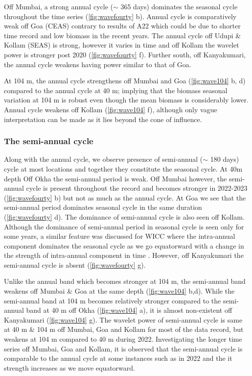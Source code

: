 \documentclass{article}
\begin{document}
	Off Mumbai, a strong annual cycle ($\sim$ 365 days) dominates the seasonal cycle throughout the time series (\cref{fig:wavefourty} b). Annual cycle is comparatively weak off Goa (CEAS) contrary to results of A22 which could be due to shorter time record and low biomass in the recent years. The annual cycle off Udupi \& Kollam (SEAS) is strong, however it varies in time and off Kollam the wavelet power is stronger post 2020 (\cref{fig:wavefourty} f). Further south, off Kanyakumari, the annual cycle weakens having power similar to that of Goa.
	
	At 104 m, the annual cycle strengthens off Mumbai and Goa (\cref{fig:wave104} b, d) compared to the annual cycle at 40 m; implying that the biomass seasonal variation at 104 m is robust even though the mean biomass is considerably lower. Annual cycle weakens off Kollam (\cref{fig:wave104} f), although only vague interpretation can be made as it lies beyond the cone of influence. 
	
	\subsubsection{The semi-annual cycle}
	
	Along with the annual cycle, we observe presence of semi-annual ($\sim$ 180 days) cycle at most locations and together they constitute the seasonal cycle. At 40m depth Off Okha the semi-annual period is weak. Off Mumbai however, the semi-annual cycle is present throughout the record and becomes stronger in 2022-2023 (\cref{fig:wavefourty} b) but not as much as the annual cycle. At Goa we see that the semi-annual period dominates seasonal cycle in the same duration (\cref{fig:wavefourty} d). The dominance of semi-annual cycle is also seen off Kollam. Although the dominance of semi-annual period in seasonal cycle is seen only for some years, a similar feature was discussed for WICC where the intra-annual component dominates the seasonal cycle as we go equatorward with a change in the strength of intra-annual component in time \citep{chaudhuri2020observed}. However, off Kanyakumari the semi-annual cycle is absent (\cref{fig:wavefourty} g).
	
	Unlike the annual band which becomes stronger at 104 m, the semi-annual band weakens off Mumbai \& Goa at the same depth (\cref{fig:wave104} b,d). While the semi-annual band at 104 m becomes relatively stronger compared to the semi-annual band at 40 m off Okha (\cref{fig:wave104} a), it is almost non-existent off Kanyakumari (\cref{fig:wave104} g). The wavelet power of semi-annual cycle is same at 40 m \& 104 m off Mumbai, Goa and Kollam for most of the data record, but weakens at 104 m compared to 40 m during 2022. Investigating the longer time series off Mumbai, Goa and Kollam, it is observed that the semi-annual cycle is comparable to the annual cycle at some instances such as in 2022 and the it strength increases as we move equatorward.
\end{document}
